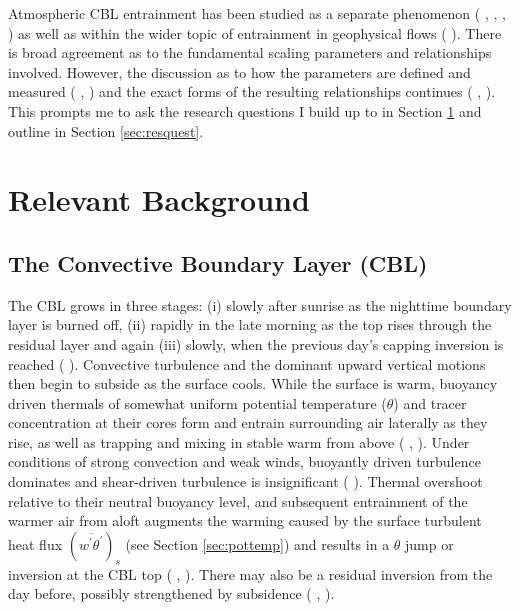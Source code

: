 Atmospheric \acs{CBL} entrainment has been studied as a separate phenomenon (\citeauthor{StullNelEl} \citeyear{StullNelEl}, \citeauthor{SullMoengStev} \citeyear{SullMoengStev}, \citeauthor{FedConzMir04} \citeyear{FedConzMir04}, \citeauthor{BrooksFowler2} \citeyear{BrooksFowler2}) as well as within the wider topic of entrainment in geophysical flows (\citeauthor{Turner86} \citeyear{Turner86}). There is broad agreement as to the fundamental scaling parameters and relationships involved.  However, the discussion as to how the parameters are defined and measured (\citeauthor{BrooksFowler2} \citeyear{BrooksFowler2}, \citeauthor{Traum11} \citeyear{Traum11}) and the exact forms of the resulting relationships continues (\citeauthor{SullMoengStev} \citeyear{SullMoengStev}, \citeauthor{FedConzMir04} \citeyear{FedConzMir04} \citeauthor{BrooksFowler2} \citeyear{BrooksFowler2}).  This prompts me to ask the research questions I build up to in Section \ref{sec:relback} and outline in Section \ref{sec:resquest}.


\section{Relevant Background}
\label{sec:relback}
\subsection{The Convective Boundary Layer (CBL)}

The \acs{CBL} grows in three stages: (i) slowly after sunrise as the nighttime boundary layer is burned off, (ii) rapidly in the late morning as the top rises through the residual layer and again (iii) slowly, when the previous day's capping inversion is reached (\citeauthor{StullNelEl} \citeyear{StullNelEl}).  Convective turbulence and the dominant upward vertical motions then begin to subside as the surface cools.  While the surface is warm, buoyancy driven thermals of somewhat uniform potential temperature ($\theta$) and tracer concentration at their cores form and entrain surrounding air laterally as they rise, as well as trapping and mixing in stable warm from above (\citeauthor{Stull-BLMetIntro} \citeyear{Stull-BLMetIntro}, \citeauthor{CrumStullEl} \citeyear{CrumStullEl}).  Under conditions of strong convection and weak winds, buoyantly driven turbulence dominates and shear-driven turbulence is insignificant (\citeauthor{DirLEddy} \citeyear{DirLEddy}). Thermal overshoot relative to their neutral buoyancy level, and subsequent entrainment of the warmer air from aloft augments the warming caused by the surface turbulent heat flux $(\overline{w^{'}\theta^{'}})_{s}$ (see Section \ref{sec:pottemp}) and results in a $\theta$ jump or inversion at the \acs{CBL} top (\citeauthor{SchmidtSchu} \citeyear{SchmidtSchu}, \citeauthor{Turner86} \citeyear{Turner86}).  There may also be a residual inversion from the day before, possibly strengthened by subsidence (\citeauthor{Stull-BLMetIntro} \citeyear{Stull-BLMetIntro}, \citeauthor{SullMoengStev} \citeyear{SullMoengStev}).\\  

